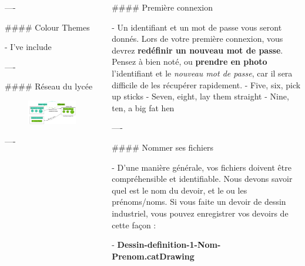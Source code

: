\documentclass{beamer}
\begin{document}
\begin{frame}[fragile]
\begin{columns}[T]
\begin{column}{.46\textwidth}
\begin{markdown}
----

#### Colour Themes

- I've include

---- 

#### Réseau du lycée


\begin{figure}
\includegraphics[width=1\textwidth]{A1.png} 
\end{figure}

----

\end{markdown}

\end{column}

\begin{column}{.46\textwidth}

\begin{markdown}

#### Première connexion

- Un identifiant et un mot de passe vous seront donnés. Lors de votre première connexion, vous devrez \textbf{redéfinir un nouveau mot de passe}. Pensez à bien noté, ou \textbf{prendre en photo} l'identifiant et le \textit{nouveau mot de passe}, car il sera difficile de les récupérer rapidement.
- Five, six, pick up sticks
- Seven, eight, lay them straight
- Nine, ten, a big fat hen

----

#### Nommer ses fichiers

- D’une manière générale, vos fichiers doivent être compréhensible et identifiable. Nous devons savoir quel est le nom du devoir, et le ou les prénoms/noms. Si vous faite un devoir de dessin industriel, vous pouvez enregistrer vos devoirs de cette façon :

- \textbf{Dessin-definition-1-Nom-Prenom.catDrawing}


\end{markdown}
\end{column}
\end{columns}
\end{frame}
\end{document}
